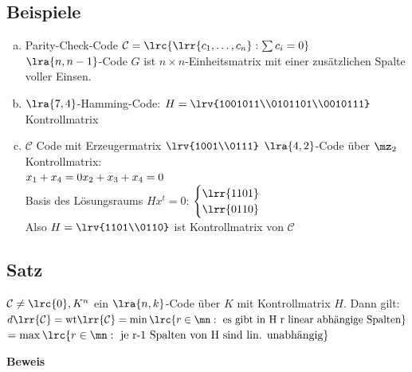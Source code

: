	\subsection{Beispiele}
		\begin{enumerate}[a)]
			\item Parity-Check-Code $\mathcal{C}=\lrc{\lrr{c_1,\dots,c_n}:\sum c_i=0}$\\
				$\lra{n,n-1}$-Code $G$ ist $n\times n$-Einheitsmatrix mit einer zusätzlichen Spalte voller Einsen.
			\item $\lra{7,4}$-Hamming-Code: $H=\lrv{1001011\\0101101\\0010111}$ Kontrollmatrix
			\item $\mathcal{C}$ Code mit Erzeugermatrix $\lrv{1001\\0111}$ $\lra{4,2}$-Code über $\mz_2$\\
				Kontrollmatrix:\\
				$x_1+x_4=0\\
				x_2+x_3+x_4=0$\\
				Basis des Lösungsraums $Hx^t=0$: $\begin{cases}\lrr{1101}\\\lrr{0110}\end{cases}$\\
				Also $H=\lrv{1101\\0110}$ ist Kontrollmatrix von $\mathcal{C}$
		\end{enumerate}

	\subsection{Satz}
		$\mathcal{C}\neq\lrc{0}, K^n$ ein $\lra{n,k}$-Code über $K$ mit Kontrollmatrix $H$. Dann gilt:\\
		$d\lrr{\mathcal{C}}=\mbox{wt}\lrr{\mathcal{C}}=\min\lrc{r\in\mn:\mbox{ es gibt in H r linear abhängige Spalten}}$\\
		$=\max\lrc{r\in\mn:\mbox{ je r-1 Spalten von H sind lin. unabhängig}}$

		\textbf{Beweis}

